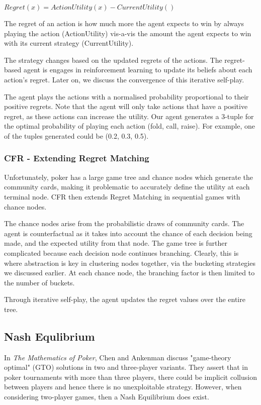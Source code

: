 \documentclass{article}
\begin{document}
\begin{center}
$Regret(x) = ActionUtility(x) - CurrentUtility()$
\end{center}

The regret of an action is how much more the agent expects to win by always playing the action (ActionUtility) vis-a-vis the amount the agent expects to win with its current strategy (CurrentUtility).

The strategy changes based on the updated regrets of the actions. The regret-based agent is engages in reinforcement learning to update its beliefs about each action's regret. Later on, we discuss the convergence of this iterative self-play.

The agent plays the actions with a normalised probability proportional to their positive regrets. Note that the agent will only take actions that have a positive regret, as these actions can increase the utility. Our agent generates a 3-tuple for the optimal probability of playing each action (fold, call, raise). For example, one of the tuples generated could be (0.2, 0.3, 0.5).

\subsubsection{CFR - Extending Regret Matching}

Unfortunately, poker has a large game tree and chance nodes which generate the community cards, making it problematic to accurately define the utility at each terminal node. CFR then extends Regret Matching in sequential games with chance nodes.

The chance nodes arise from the probabilistic draws of community cards. The agent is counterfactual as it takes into account the chance of each decision being made, and the expected utility from that node. The game tree is further complicated because each decision node continues branching. Clearly, this is where abstraction is key in clustering nodes together, via the bucketing strategies we discussed earlier. At each chance node, the branching factor is then limited to the number of buckets.

Through iterative self-play, the agent updates the regret values over the entire tree.

\subsection{Nash Equlibrium}

In \textit{The Mathematics of Poker}, Chen and Ankenman discuss "game-theory optimal" (GTO) solutions in two and three-player variants. They assert that in poker tournaments with more than three players, there could be implicit collusion between players and hence there is no unexploitable strategy. However, when considering two-player games, then a Nash Equilibrium does exist. 
\end{document}
